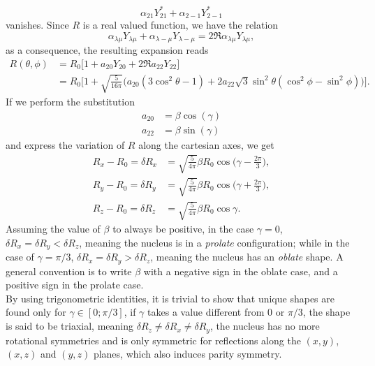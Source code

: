 \begin{equation*}\alpha_{21}Y^*_{21} + \alpha_{2-1}Y^*_{2-1}\end{equation*} vanishes. Since $R$ is a real valued function, we have the relation
\begin{equation}
\alpha_{\lambda \mu}Y_{\lambda\mu}+\alpha_{\lambda -\mu}Y_{\lambda-\mu}=2\Re{\alpha_{\lambda \mu}Y_{\lambda\mu}},
\end{equation}
as a consequence, the resulting expansion reads
\begin{align}
    R(\theta, \phi) &= R_0\bigg[1+a_{20}Y_{20}+2\Re{a_{22}Y_{22}}\bigg]\nonumber
    \\&=R_0\bigg[1+\sqrt{\frac{5}{16\pi}}\bigg(a_{20}(3\cos^2\theta-1)+ 2a_{22}\sqrt{3}\sin^2\theta(\cos^2\phi-\sin^2\phi) \bigg)\bigg].
\end{align}
If we perform the substitution 
\begin{align}
    \label{eq:a20}
    a_{20} &= \beta\cos(\gamma)
    \\  a_{22} &= \beta\sin(\gamma)\label{eq:a22}
\end{align} 
and express the variation of $R$ along the cartesian axes, we get 
\begin{align}
     R_x - R_0  =\delta R_{x}&=\sqrt{\frac{5}{4\pi}}\beta R_0 \cos\bigg(\gamma - \frac{2\pi}{3}\bigg),
    \\R_y - R_0 =\delta R_{y}&=\sqrt{\frac{5}{4\pi}}\beta R_0 \cos\bigg(\gamma + \frac{2\pi}{3}\bigg),
    \\R_z - R_0 =\delta R_{z}&=\sqrt{\frac{5}{4\pi}}\beta R_0 \cos\gamma.
\end{align}
Assuming the value of $\beta$ to always be positive, in the case $\gamma=0$, $\delta R_x = \delta R_y <\delta R_z$, meaning the nucleus is in a \textit{prolate} configuration; while in the case of $\gamma = \pi/3$, $\delta R_x = \delta R_y > \delta R_z$, meaning the nucleus has an \textit{oblate} shape. A general convention is to write $\beta$ with a negative sign in the oblate case, and a positive sign in the prolate case.
\\By using trigonometric identities, it is trivial to show that unique shapes are found only for $\gamma\in [0; \pi/3]$, if $\gamma$ takes a value different from $0$ or $\pi/3$, the shape is said to be triaxial, meaning $\delta R_z \neq \delta R_x \neq \delta R_y$, the nucleus has no more rotational symmetries and is only symmetric for reflections along the $(x, y)$, $(x, z)$ and $(y, z)$ planes, which also induces parity symmetry.
